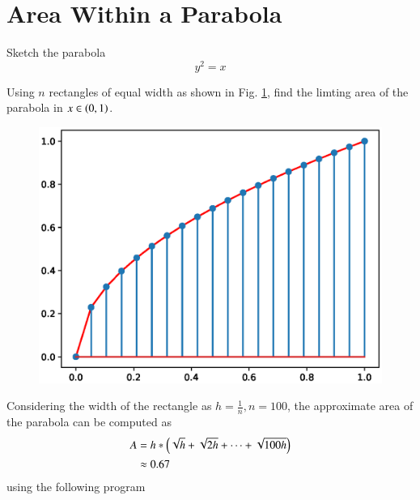 \documentclass[journal,12pt,twocolumn]{IEEEtran}
\begin{document}
\section{Area Within a Parabola}
\begin{problem}
Sketch the parabola
\begin{equation}
y^2 = x
\end{equation}
\end{problem}
%
\begin{problem}
\label{prob:parabola_area}
Using $n$ rectangles of equal width as shown in Fig. \ref{fig:parabola_area}, find the limting area of the parabola in
$x \in \left(0,1\right)$.
\end{problem}
\begin{figure}[!h]
\centering
\includegraphics[width=\columnwidth]{./figs/parabola_area.eps}
\caption{}
\label{fig:parabola_area}
\end{figure}
%
\solution Considering the width of the rectangle as $h = \frac{1}{n}, n = 100$, the approximate area of the parabola
can be computed as
%
\begin{align}
A &= h*\left(\sqrt{h}+\sqrt{2h}+\dots+\sqrt{100h}\right)
\\
&\approx 0.67
\end{align}
using the following program

%
\end{document}
